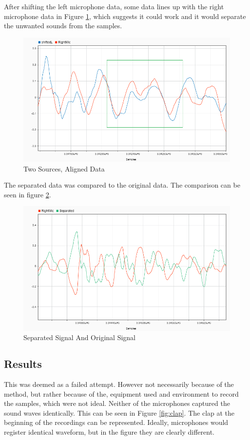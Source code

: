 After shifting the left microphone data, some data lines up with the right 
microphone data in Figure \ref{fig:2sourcesShifted}, which suggests it could work 
and it would separate the unwanted sounds from the samples. 

\begin{figure}[htp]
  \centering
  \includegraphics[width=1\linewidth]{Illustrations/twoSourcesShiftedandOriginal.png}
  \caption{Two Sources, Aligned Data}
  \label{fig:2sourcesShifted}
\end{figure}
\newpage
The separated data was compared to the original data. The comparison can be seen in figure \ref{fig:2sourcesSeparated}.
\begin{figure}[htp]
  \centering
  \includegraphics[width=0.7\linewidth]{Illustrations/twoSourcesSeparatedandOriginal.png}
  \caption{Separated Signal And Original Signal}
  \label{fig:2sourcesSeparated}
\end{figure}
\subsection*{Results}

This was deemed as a failed attempt. However not necessarily because of the method, 
but rather because of the, equipment used and environment to record the samples, 
which were not ideal. Neither of the microphones captured the sound waves 
identically. This can be seen in Figure \ref{fig:clap}. The clap at the beginning 
of the recordings can be represented. Ideally, microphones would register identical 
waveform, but in the figure they are clearly different.\\



